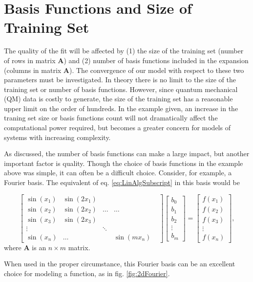 \section{Basis Functions and Size of Training Set}\label{Sect:samplesAndFunctions}
\par The quality of the fit will be affected by (1) the size of the training set (number of rows in matrix $\mathbf{A}$) and (2) number of basis functions included in the expansion (columns in matrix $\mathbf{A}$). The convergence of our model with respect to these two parameters must be investigated. In theory there is no limit to the size of the training set or number of basis functions. However, since quantum mechanical (QM) data is costly to generate, the size of the training set has a reasonable upper limit on the order of hundreds. In the example given, an increase in the traning set size or basis functions count will not dramatically affect the computational power required, but becomes a greater concern for models of systems with increasing complexity. 
\par As discussed, the number of basis functions can make a large impact, but another important factor is quality. Though the choice of basis functions in the example above was simple, it can often be a difficult choice. Consider, for example, a Fourier basis. The equivalent of eq. \ref{eq:LinAlgSubscript} in this basis would be

\begin{equation} \label{eq:fourierBasis}
\begin{bmatrix}
\sin(x_1) & \sin(2x_1) \\
\sin(x_2) & \sin(2x_2) & \ldots & \ldots \\
\sin(x_3) & \sin(2x_3) \\
\vdots & & \ddots & & \\
\sin(x_n) & \ldots & & \sin(mx_n)
\end{bmatrix}
\begin{bmatrix}
b_0 \\
b_1 \\
b_2 \\
\vdots \\
b_m 
\end{bmatrix}
=
\begin{bmatrix}
f(x_1) \\ 
f(x_2) \\
f(x_3) \\ 
\vdots \\
f(x_n)
\end{bmatrix},
\end{equation}
where $\mathbf{A}$ is an $n\times m$ matrix.
\par When used in the proper circumstance, this Fourier basis can be an excellent choice for modeling a function, as in fig. \ref{fig:2dFourier}.

